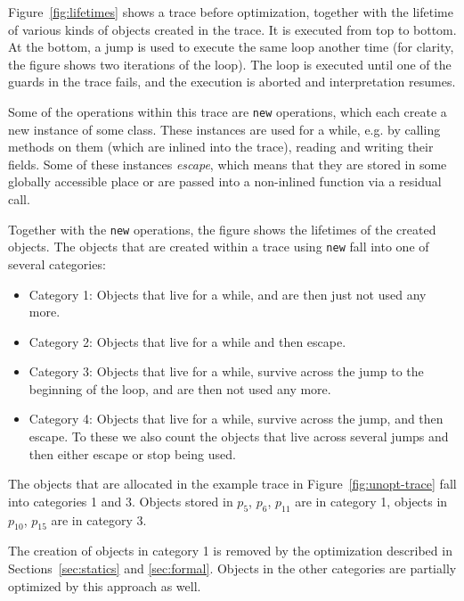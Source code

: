 \documentclass{sigplanconf}
\begin{document}
Figure~\ref{fig:lifetimes} shows a trace before optimization, together with the
lifetime of various kinds of objects created in the trace. It is executed from
top to bottom. At the bottom, a jump is used to execute the same loop another
time (for clarity, the figure shows two iterations of the loop). The loop is
executed until one of the guards in the trace fails, and the execution is
aborted and interpretation resumes.

Some of the operations within this trace are \lstinline{new} operations, which each
create a new instance of some class. These instances are used for a while, e.g.
by calling methods on them (which are inlined into the trace), reading and
writing their fields. Some of these instances \emph{escape}, which means that
they are stored in some globally accessible place or are passed into a
non-inlined function via a residual call.

Together with the \lstinline{new} operations, the figure shows the lifetimes of the
created objects. The objects that are created within a trace using \lstinline{new}
fall into one of several categories:

\begin{itemize}
    \item Category 1: Objects that live for a while, and are then just not
    used any more.

    \item Category 2: Objects that live for a while and then escape.

    \item Category 3: Objects that live for a while, survive across the jump to
    the beginning of the loop, and are then not used any more.

    \item Category 4: Objects that live for a while, survive across the jump,
    and then escape. To these we also count the objects that live across several
    jumps and then either escape or stop being used.
\end{itemize}

The objects that are allocated in the example trace in
Figure~\ref{fig:unopt-trace} fall into categories 1 and 3. Objects stored in
$p_{5}$, $p_{6}$, $p_{11}$ are in category 1, objects in $p_{10}$, $p_{15}$ are in
category 3.

The creation of objects in category 1 is removed by the optimization described
in Sections~\ref{sec:statics} and \ref{sec:formal}. Objects in the other
categories are partially optimized by this approach as well.
\end{document}
